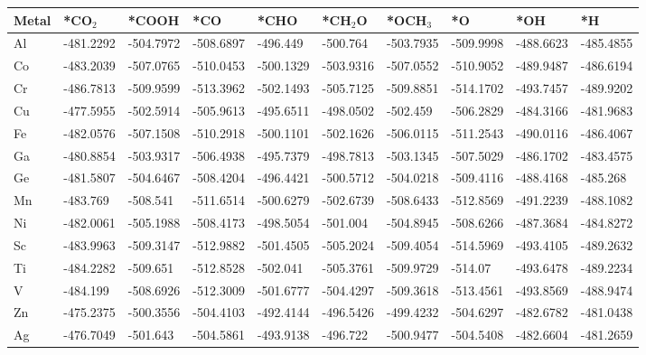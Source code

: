 \begin{table}[h]
  \centering
  {\fontsize{6}{12}\selectfont
  \begin{tabular}{*{10}{l}}
    \hline
    Metal & *CO$_2$ & *COOH    & *CO       & *CHO      & *CH$_2$O  & *OCH$_3$  & *O        & *OH       & *H        \\
    \hline
    Al & -481.2292 & -504.7972 & -508.6897 & -496.449  & -500.764  & -503.7935 & -509.9998 & -488.6623 & -485.4855 \\
    Co & -483.2039 & -507.0765 & -510.0453 & -500.1329 & -503.9316 & -507.0552 & -510.9052 & -489.9487 & -486.6194 \\
    Cr & -486.7813 & -509.9599 & -513.3962 & -502.1493 & -505.7125 & -509.8851 & -514.1702 & -493.7457 & -489.9202 \\
    Cu & -477.5955 & -502.5914 & -505.9613 & -495.6511 & -498.0502 & -502.459  & -506.2829 & -484.3166 & -481.9683 \\
    Fe & -482.0576 & -507.1508 & -510.2918 & -500.1101 & -502.1626 & -506.0115 & -511.2543 & -490.0116 & -486.4067 \\
    Ga & -480.8854 & -503.9317 & -506.4938 & -495.7379 & -498.7813 & -503.1345 & -507.5029 & -486.1702 & -483.4575 \\
    Ge & -481.5807 & -504.6467 & -508.4204 & -496.4421 & -500.5712 & -504.0218 & -509.4116 & -488.4168 & -485.268  \\
    Mn & -483.769  & -508.541  & -511.6514 & -500.6279 & -502.6739 & -508.6433 & -512.8569 & -491.2239 & -488.1082 \\
    Ni & -482.0061 & -505.1988 & -508.4173 & -498.5054 & -501.004  & -504.8945 & -508.6266 & -487.3684 & -484.8272 \\
    Sc & -483.9963 & -509.3147 & -512.9882 & -501.4505 & -505.2024 & -509.4054 & -514.5969 & -493.4105 & -489.2632 \\
    Ti & -484.2282 & -509.651  & -512.8528 & -502.041  & -505.3761 & -509.9729 & -514.07   & -493.6478 & -489.2234 \\
    V  & -484.199  & -508.6926 & -512.3009 & -501.6777 & -504.4297 & -509.3618 & -513.4561 & -493.8569 & -488.9474 \\
    Zn & -475.2375 & -500.3556 & -504.4103 & -492.4144 & -496.5426 & -499.4232 & -504.6297 & -482.6782 & -481.0438 \\
    Ag & -476.7049 & -501.643  & -504.5861 & -493.9138 & -496.722  & -500.9477 & -504.5408 & -482.6604 & -481.2659 \\

\end{tabular}}
\end{table}
